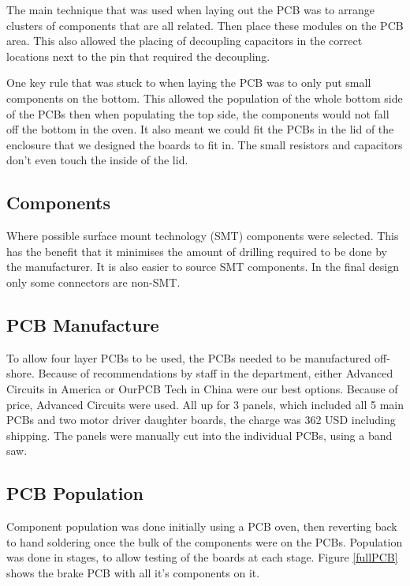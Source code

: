   The main technique that was used when laying out the PCB was to arrange
  clusters of components that are all related. Then place these modules on the
  PCB area. This also allowed the placing of decoupling capacitors in the
  correct locations next to the pin that required the decoupling.
  
  One key rule that was stuck to when laying the PCB was to only put small
  components on the bottom. This allowed the population of the whole bottom side
  of the PCBs then when populating the top side, the components would not fall
  off the bottom in the oven. It also meant we could fit the PCBs in the lid of
  the enclosure that we designed the boards to fit in. The small resistors and
  capacitors don't even touch the inside of the lid.

  \subsection{Components}
  Where possible surface mount technology (SMT) components were selected. This
  has the benefit that it minimises the amount of drilling required to be done
  by the manufacturer. It is also easier to source SMT components. In the final
  design only some connectors are non-SMT.

  \subsection{PCB Manufacture}
  To allow four layer PCBs to be used, the PCBs needed to be manufactured
  off-shore. Because of recommendations by staff in the department, either
  Advanced Circuits in America\cite{advancedCircuits} or OurPCB Tech in
  China\cite{ourPCB} were our best options.  Because of price, Advanced Circuits
  were used. All up for 3 panels, which included all 5 main PCBs and two motor
  driver daughter boards, the charge was 362 USD including shipping. The panels
  were manually cut into the individual PCBs, using a band saw.
  
  \subsection{PCB Population}
  Component population was done initially using a PCB oven, then
  reverting back to hand soldering once the bulk of the components were on the
  PCBs. Population was done in stages, to allow testing of the boards at each
  stage. Figure \ref{fullPCB} shows the brake PCB with all it's components on
  it.
  
